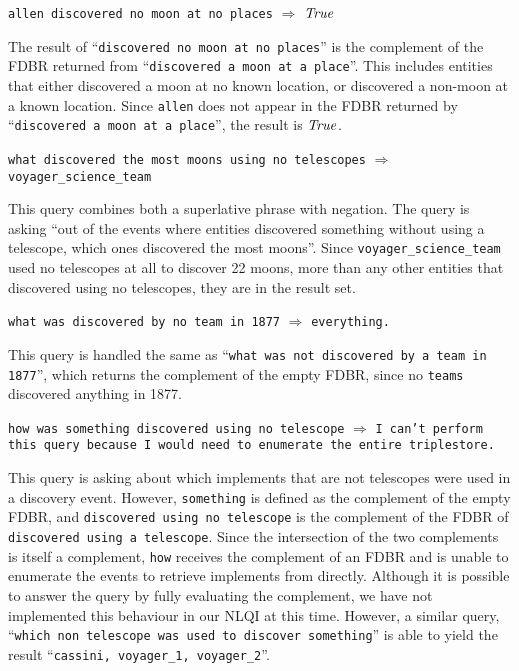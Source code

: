 \documentclass[../main.tex]{subfiles}
\begin{document}
\begin{refsection}
\examplespacing

\texttt{allen discovered no moon at no places} $\Rightarrow$ $\operatorname{\mathit{True}}$

\examplespacing

\noindent The result of ``\texttt{discovered no moon at no places}'' is the complement of the FDBR returned from ``\texttt{discovered a moon at a place}''.  This includes entities that either discovered a moon at no known location, or discovered a non-moon at a known location.  Since \texttt{allen} does not appear in the FDBR returned by ``\texttt{discovered a moon at a place}'', the result is $\operatorname{\mathit{True}}$.

\examplespacing

\texttt{what discovered the most moons using no telescopes} \linebreak \indent \indent $\Rightarrow$ \texttt{voyager\_science\_team}

\examplespacing

\noindent This query combines both a superlative phrase with negation.  The query is asking ``out of the events where entities discovered something without using a telescope, which ones discovered the most moons''.  Since \texttt{voyager\_science\_team} used no telescopes at all to discover 22 moons, more than any other entities that discovered using no telescopes, they are in the result set.

\examplespacing

\texttt{what was discovered by no team in 1877} $\Rightarrow$ \texttt{everything.}

\examplespacing

\noindent This query is handled the same as ``\texttt{what was not discovered by a team in 1877}'', which returns the complement of the empty FDBR, since no \texttt{teams} discovered anything in 1877.

\examplespacing

\texttt{how was something discovered using no telescope} $\Rightarrow$ \texttt{I can't perform this query because I would need to enumerate the entire triplestore.}

\examplespacing

\noindent This query is asking about which implements that are not telescopes were used in a discovery event.  However, \texttt{something} is defined as the complement of the empty FDBR, and \texttt{discovered using no telescope} is the complement of the FDBR of \texttt{discovered using a telescope}.  Since the intersection of the two complements is itself a complement, \texttt{how} receives the complement of an FDBR and is unable to enumerate the events to retrieve implements from directly.  Although it is possible to answer the query by fully evaluating the complement, we have not implemented this behaviour in our NLQI at this time.  However, a similar query, ``\texttt{which non telescope was used to discover something}'' is able to yield the result ``\texttt{cassini, voyager\_1, voyager\_2}''.


\end{refsection}
\end{document}
